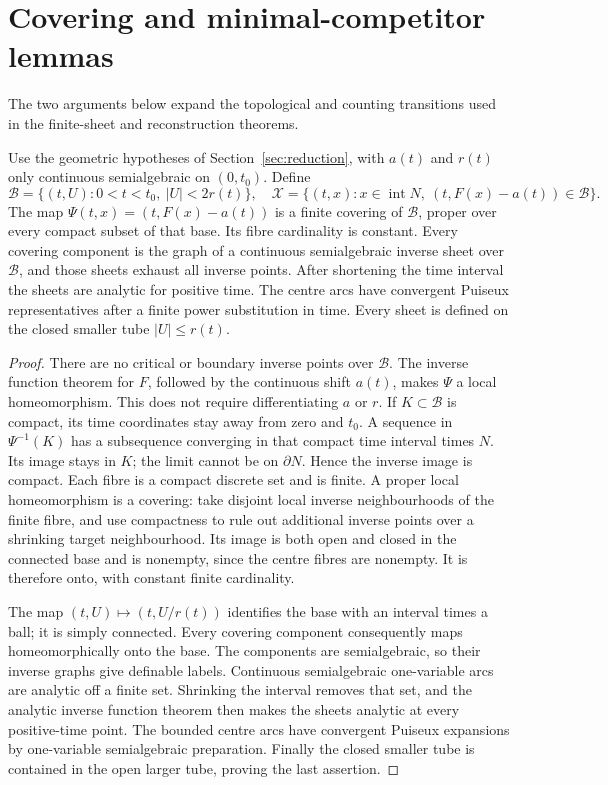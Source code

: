\section{Covering and minimal-competitor lemmas}\label{app:transitions}
The two arguments below expand the topological and counting transitions
used in the finite-sheet and reconstruction theorems.

\begin{lemma}\label{lem:param-cover}
Use the geometric hypotheses of Section~\ref{sec:reduction}, with $a(t)$
and $r(t)$ only continuous semialgebraic on $(0,t_0)$. Define
\[
 \mathcal B=\{(t,U):0<t<t_0,\ |U|<2r(t)\},\quad
 \mathcal X=\{(t,x):x\in\operatorname{int}N,
                  \ (t,F(x)-a(t))\in\mathcal B\}.
\]
The map $\Psi(t,x)=(t,F(x)-a(t))$ is a finite covering of $\mathcal B$,
proper over every compact subset of that base. Its fibre cardinality is
constant. Every covering component is the graph of a continuous
semialgebraic inverse sheet over $\mathcal B$, and those sheets exhaust
all inverse points. After shortening the time interval the sheets are
analytic for positive time. The centre arcs have convergent Puiseux
representatives after a finite power substitution in time. Every sheet
is defined on the closed smaller tube $|U|\le r(t)$.
\end{lemma}
\begin{proof}
There are no critical or boundary inverse points over $\mathcal B$.
The inverse function theorem for $F$, followed by the continuous shift
$a(t)$, makes $\Psi$ a local homeomorphism. This does not require
differentiating $a$ or $r$. If $K\subset\mathcal B$ is compact, its time
coordinates stay away from zero and $t_0$. A sequence in $\Psi^{-1}(K)$
has a subsequence converging in that compact time interval times $N$.
Its image stays in $K$; the limit cannot be on $\partial N$. Hence the
inverse image is compact. Each fibre is a compact discrete set and is
finite. A proper local homeomorphism is a covering: take disjoint local
inverse neighbourhoods of the finite fibre, and use compactness to rule
out additional inverse points over a shrinking target neighbourhood.
Its image is both open and closed in the connected base and is nonempty,
since the centre fibres are nonempty. It is therefore onto, with constant
finite cardinality.

The map $(t,U)\mapsto(t,U/r(t))$ identifies the base with an interval
times a ball; it is simply connected. Every covering component consequently
maps homeomorphically onto the base. The components are semialgebraic,
so their inverse graphs give definable labels. Continuous semialgebraic
one-variable arcs are analytic off a finite set. Shrinking the interval
removes that set, and the analytic inverse function theorem then makes
the sheets analytic at every positive-time point. The bounded centre
arcs have convergent Puiseux expansions by one-variable semialgebraic
preparation. Finally the closed smaller tube is contained in the open
larger tube, proving the last assertion.
\end{proof}

